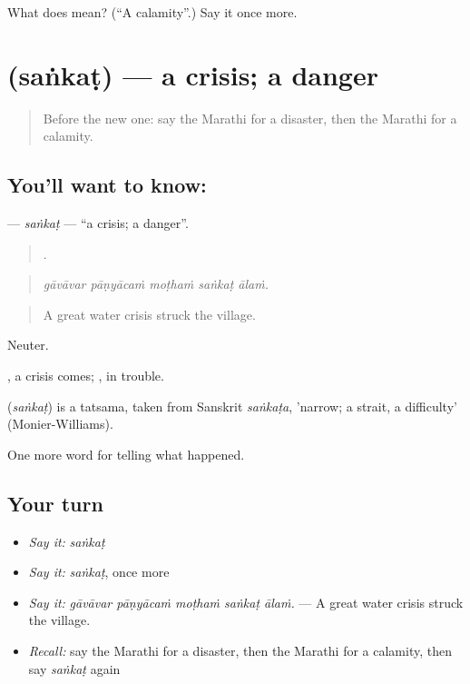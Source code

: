 \begin{tcolorbox}[breakable,colback=teal!4,colframe=teal!35!black,title={Before you move on}]
What does  mean? (\textquotedblleft{}A calamity\textquotedblright{}.) Say it once more.
\end{tcolorbox}
\section[\texorpdfstring{\mr{संकट} (saṅkaṭ)}{संकट (saṅkaṭ)}]{ (saṅkaṭ) — a crisis; a danger}

\label{lesson:MR-C295-sankat}



\begin{quote}
Before the new one: say the Marathi for a disaster, then the Marathi for a calamity.
\end{quote}

\subsection*{You'll want to know: }
\textbf{} — \emph{saṅkaṭ} — \textquotedblleft{}a crisis; a danger\textquotedblright{}.

\begin{quote}
    .
\end{quote}

\begin{quote}
\emph{gāvāvar pāṇyācaṁ moṭhaṁ saṅkaṭ ālaṁ.}
\end{quote}

\begin{quote}
A great water crisis struck the village.
\end{quote}

Neuter.

 , a crisis comes; , in trouble.

\begin{cousinweb}
\textbf{} (\emph{saṅkaṭ}) is a tatsama, taken from Sanskrit \emph{saṅkaṭa}, 'narrow; a strait, a difficulty' (Monier-Williams).
\end{cousinweb}

\begin{grammarlens}[title={What you've built}]
One more word for telling what happened.
\end{grammarlens}

\subsection*{Your turn}
\begin{itemize}
\raggedright
  \item \emph{Say it:} \emph{saṅkaṭ}
  \item \emph{Say it:} \emph{saṅkaṭ}, once more
  \item \emph{Say it:} \emph{gāvāvar pāṇyācaṁ moṭhaṁ saṅkaṭ ālaṁ.} — A great water crisis struck the village.
  \item \emph{Recall:} say the Marathi for a disaster, then the Marathi for a calamity, then say \emph{saṅkaṭ} again
\end{itemize}

